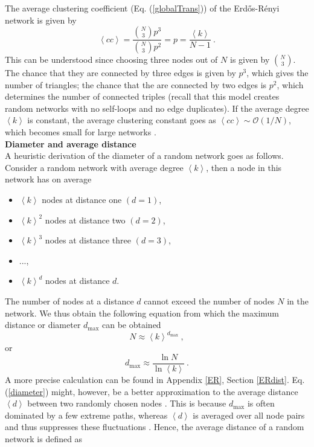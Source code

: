 \documentclass[11 pt , letterpaper , twoside , openright]{book}
\begin{document}
\newline
The average clustering coefficient (Eq. (\ref{globalTrans})) of the Erd\H{o}s-R\'{e}nyi network is given by \cite{Clauset2011}
\begin{equation}\label{C}
	\left<cc\right> = \frac{\binom{N}{3}p^3}{\binom{N}{3}p^2} = p = \frac{\left<k\right>}{N-1} \ .
\end{equation}
This can be understood since choosing three nodes out of $N$ is given by $\binom{N}{3}$. The chance that they are connected by three edges is given by $p^3$, which gives the number of triangles; the chance that the are connected by two edges is $p^2$, which determines the number of connected triples (recall that this model creates random networks with no self-loops and no edge duplicates). If the average degree $\left<k\right>$ is constant, the average clustering constant goes as $\left<cc\right> \sim \mathcal{O}(1/N)$, which becomes small for large networks \cite{Clauset2011}. \\
\newline
\textbf{Diameter and average distance}\\
\newline
A heuristic derivation of the diameter of a random network goes as follows. Consider a random network with average degree $\left<k\right>$, then a node in this network has on average \cite{Albert2014}
\begin{itemize}
	\item $\left<k\right>$ nodes at distance one $(d=1)$,
	\item $\left<k\right>^2$ nodes at distance two $(d=2)$,
	\item $\left<k\right>^3$ nodes at distance three $(d=3)$,
	\item ...,
	\item $\left<k\right>^d$ nodes at distance $d$.
\end{itemize}
The number of nodes at a distance $d$ cannot exceed the number of nodes $N$ in the network. We thus obtain the following equation from which the maximum distance or diameter $d_{\textrm{max}}$ can be obtained
\begin{equation}
	N \approx \left<k\right>^{d_{\textrm{max}}} \ ,
\end{equation}
or 
\begin{equation}\label{diameter}
	d_{\textrm{max}} \approx \frac{\ln{N}}{\ln{\left<k\right>}} \ .
\end{equation}
A more precise calculation can be found in Appendix \ref{ER}, Section \ref{ERdist}. Eq. (\ref{diameter}) might, however, be a better approximation to the average distance $\left<d\right>$ between two randomly chosen nodes \cite{Albert2014}. This is because $d_{\textrm{max}}$ is often dominated by a few extreme paths, whereas $\left<d\right>$ is averaged over all node pairs and thus suppresses these fluctuations \cite{Albert2014}. Hence, the average distance of a random network is defined as \cite{Albert2014}
\end{document}
